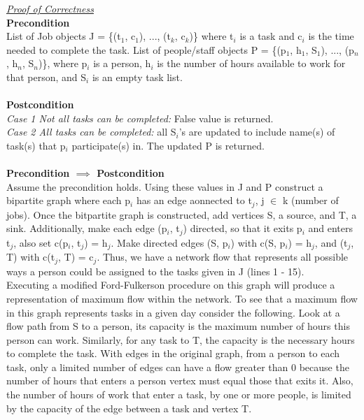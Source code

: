 \documentclass[10pt]{csc_assignment}
\begin{document}
\begin{description}
\emph{\underline{Proof of Correctness}}\\
\textbf{Precondition}\\
List of Job objects J = \{(t$_{1}$, c$_{1}$), ..., (t$_{k}$, c$_{k}$)\} where t$_{i}$ is a task and c$_{i}$ is the time needed to complete the task. List of people/staff objects P = \{(p$_{1}$, h$_{1}$, S$_{1}$), ..., (p$_{n}$, h$_{n}$, S$_{n}$)\}, where p$_{i}$ is a person, h$_{i}$ is the number of hours available to work for that person, and S$_{i}$ is an empty task list.\\
\\
\textbf{Postcondition}\\
\emph{Case 1 Not all tasks can be completed:} False value is returned.\\
\emph{Case 2 All tasks can be completed:} all S$_{i}$'s are updated to include name(s) of task(s) that p$_{i}$ participate(s) in. The updated P is returned.\\ 
\\
\textbf{Precondition $\implies$ Postcondition}\\ 
Assume the precondition holds. Using these values in J and P construct a bipartite graph where each p$_{i}$ has an edge aonnected to t$_{j}$, j $\in$ k (number of jobs). Once the bitpartite graph is constructed, add vertices S, a source, and T, a sink. Additionally, make each edge (p$_{i}$, t$_{j}$) directed, so that it exits p$_{i}$ and enters  t$_{j}$, also set c(p$_{i}$, t$_{j}$) = h$_{j}$. Make directed edges (S, p$_{i}$) with c(S, p$_{i}$) = h$_{j}$, and (t$_{j}$, T) with c(t$_{j}$, T) = c$_{j}$. Thus, we have a network flow that represents all possible ways a person could be assigned to the tasks given in J (lines 1 - 15). \\
Executing a modified Ford-Fulkerson procedure on this graph will produce a representation of maximum flow within the network. To see that a maximum flow in this graph represents tasks in a given day consider the following. Look at a flow path from S to a person, its capacity is the maximum number of hours this person can work. Similarly, for any task to T, the capacity is the necessary hours to complete the task. With edges in the original graph, from a person to each task, only a limited number of edges can have a flow greater than 0 because the number of hours that enters a person vertex must equal those that exits it. Also, the number of hours of work that enter a task, by one or more people, is limited by the capacity of the edge between a task and vertex T. \\

\end{description}
\end{document}
